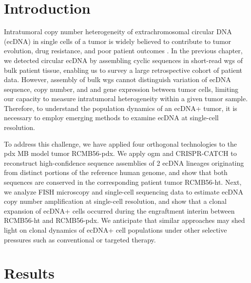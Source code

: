 \section{Introduction}
\par Intratumoral copy number heterogeneity of extrachromosomal circular DNA (\gls{ecDNA}) in single cells of a tumor is widely believed to contribute to tumor evolution, drug resistance, and poor patient outcomes \cite{bafna_2022}. In the previous chapter, we detected circular ecDNA by assembling cyclic sequences in short-read \gls{wgs} of bulk patient tissue, enabling us to survey a large retrospective cohort of patient data. However, assembly of bulk \gls{wgs} cannot distinguish variation of ecDNA sequence, copy number, and and gene expression between tumor cells, limiting our capacity to measure intratumoral heterogeneity within a given tumor sample. Therefore, to understand the population dynamics of an ecDNA+ tumor, it is necessary to employ emerging methods to examine ecDNA at single-cell resolution. 
\par To address this challenge, we have applied four orthogonal technologies to the \gls{pdx} MB model tumor RCMB56-pdx. We apply \gls{ogm} and CRISPR-CATCH \cite{crispr-catch} to reconstruct high-confidence sequence assemblies of 2 ecDNA lineages originating from distinct portions of the reference human genome, and show that both sequences are conserved in the corresponding patient tumor RCMB56-ht. Next, we analyze FISH microscopy and single-cell sequencing data to estimate ecDNA copy number amplification at single-cell resolution, and show that a clonal expansion of ecDNA+ cells occurred during the engraftment interim between RCMB56-ht and RCMB56-pdx. We anticipate that similar approaches may shed light on clonal dynamics of ecDNA+ cell populations under other selective pressures such as conventional or targeted therapy.

\section{Results}
